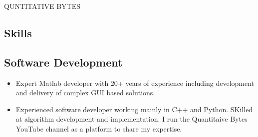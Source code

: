\documentclass[11pt,oneside,a4paper,titlepage]{article}
\begin{document}
\newpage
\begin{tcolorbox}[colback=titleBack]
	\color{white}
	QUNTITATIVE BYTES
	\hspace*{\fill}{Curriculum Vitae}
\end{tcolorbox}
\begin{tcolorbox}[colback=white]
	\section*{Skills}
	\subsection*{Software Development}
	\begin{itemize}
	\item 
	Expert Matlab developer with 20+ years of experience including development and delivery of complex GUI based solutions.
	
	\item
	Experienced software developer working mainly in C++ and Python.
	SKilled at algorithm development and implementation. I run the Quantitaive Bytes YouTube channel as a platform to share my expertise.
	\end{itemize}
\end{tcolorbox}
\end{document}
